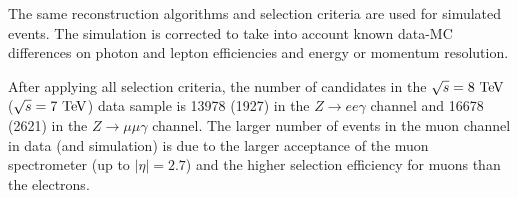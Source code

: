 The same reconstruction algorithms and selection criteria are used for
simulated events. The simulation is corrected to take into account known data-MC
differences on photon and lepton efficiencies and energy or momentum resolution.

After applying all selection criteria, the number of \HToZg candidates in the
$\rts = 8 \TeV$ ($\rts = 7 \TeV$) data sample is 13978 (1927) in the 
$Z \to ee\gamma$ channel and 16678 (2621) in the $Z \to \mu\mu\gamma$
channel. The larger number of events in the muon channel in data (and simulation)
is due to the larger acceptance of the muon spectrometer (up to $|\eta| = 2.7$)
and the higher selection efficiency for muons than the electrons.

